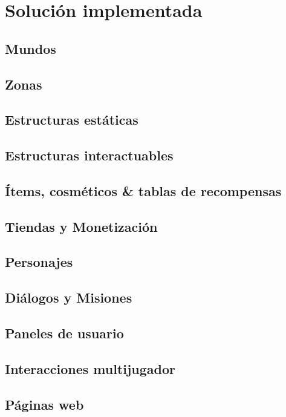 \section{Solución implementada}



\subsection{Mundos}

\subsection{Zonas}

\subsection{Estructuras estáticas}

\subsection{Estructuras interactuables}

\subsection{Ítems, cosméticos \& tablas de recompensas}

\subsection{Tiendas y Monetización}
\label{sec:shops-and-money}

\subsection{Personajes}

\subsection{Diálogos y Misiones}

\subsection{Paneles de usuario}

\subsection{Interacciones multijugador}


\subsection{Páginas web}




